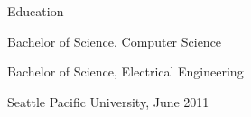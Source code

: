 \documentclass[letterpaper,12pt]{article}
\begin{document}
\begin{paracol}{2}
\begin{rsection}{Education}
\begin{rcontent}{Bachelor of Science, Computer Science

  \noindent Bachelor of Science, Electrical Engineering

  \textnormal{%
      \sffamily
      \normalsize
      \hfill
      Seattle Pacific University, June 2011}
}
\end{rcontent}
\end{rsection}


\flushpage
\end{paracol}
\end{document}
